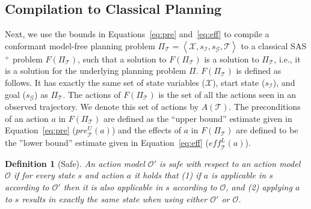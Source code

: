 \documentclass{article}
\newtheorem{definition}{Definition}
\newcommand{\tuple}[1]{\ensuremath{\left \langle #1 \right \rangle }}
\newcommand{\SAS}{SAS$^+$}
\newcommand{\cmfp}{conformant model-free planning}
\newcommand{\eff}{\textit{eff}}
\newcommand{\pre}{\textit{pre}}
\begin{document}
	
	
	\subsection{Compilation to Classical Planning} 
	Next, we use the bounds in Equations~\ref{eq:pre} and~\ref{eq:eff} to compile a \cmfp{} problem 
	$\Pi_\mathcal{T}=\tuple{\mathcal{X},s_\mathcal{I}, s_\mathcal{G}, \mathcal{T}}$ 
	to a classical \SAS{} problem $F(\Pi_\mathcal{T})$, such that a solution to $F(\Pi_\mathcal{T})$ 
	is a solution to $\Pi_\mathcal{T}$, i.e., it is a solution for the underlying planning problem $\Pi$. 
	$F(\Pi_\mathcal{T})$ is defined as follows. It has exactly the same set of 
	state variables ($\mathcal{X}$), start state ($s_\mathcal{I}$), and goal ($s_\mathcal{G}$) as $\Pi_\mathcal{T}$. The actions of $F(\Pi_\mathcal{T})$ is the set of all the actions seen in an observed trajectory. We denote this set of actions by $A(\mathcal{T})$. 
	The preconditions of an action $a$ in  $F(\Pi_\mathcal{T})$ 
	are defined as the ``upper bound'' estimate given in Equation~\ref{eq:pre} ($\pre_\mathcal{T}^U(a)$) and the effects of $a$ in  $F(\Pi_\mathcal{T})$  
	are defined to be the ''lower bound'' estimate given in 
	Equation~\ref{eq:eff} ($\eff_\mathcal{T}^L(a)$).
	
	\begin{definition}[Safe]
		An action model $\mathcal{O}'$ is safe with respect to an action model $\mathcal{O}$
		if for every state $s$ and action $a$ it holds that (1) if $a$ is applicable in $s$ according to $\mathcal{O}'$ then it is also applicable in $s$ according to $\mathcal{O}$, and (2) applying $a$ to $s$ results in exactly the same state when using either $\mathcal{O}'$ or $\mathcal{O}$. 
		\label{def:safe}
	\end{definition}
	
\end{document}

